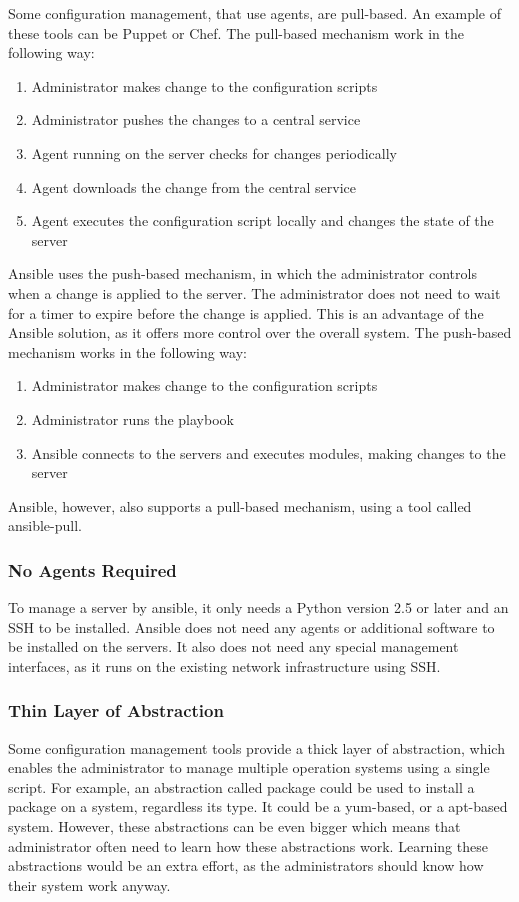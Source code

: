 Some configuration management, that use agents, are pull-based. An example of these tools can be Puppet or Chef. The pull-based mechanism work in the following way:
\begin{enumerate}
  \item{Administrator makes change to the configuration scripts}
  \item{Administrator pushes the changes to a central service}
  \item{Agent running on the server checks for changes periodically}
  \item{Agent downloads the change from the central service}
  \item{Agent executes the configuration script locally and changes the state of the server}
\end{enumerate}
Ansible uses the push-based mechanism, in which the administrator controls when a change is applied to the server. \cite{UpAndRunning} The administrator does not need to wait for a timer to expire before the change is applied. This is an advantage of the Ansible solution, as it offers more control over the overall system. The push-based mechanism works in the following way:
\begin{enumerate}
  \item{Administrator makes change to the configuration scripts}
  \item{Administrator runs the playbook}
  \item{Ansible connects to the servers and executes modules, making changes to the server}
\end{enumerate}
Ansible, however, also supports a pull-based mechanism, using a tool called ansible-pull.

\subsubsection*{No Agents Required}
To manage a server by ansible, it only needs a Python version 2.5 or later and an SSH to be installed. Ansible does not need any agents or additional software to be installed on the servers. It also does not need any special management interfaces, as it runs on the existing network infrastructure using SSH.

\subsubsection*{Thin Layer of Abstraction}
Some configuration management tools provide a thick layer of abstraction, which enables the administrator to manage multiple operation systems using a single script. For example, an abstraction called package could be used to install a package on a system, regardless its type. It could be a yum-based, or a apt-based system. However, these abstractions can be even bigger which means that administrator often need to learn how these abstractions work. Learning these abstractions would be an extra effort, as the administrators should know how their system work anyway.

